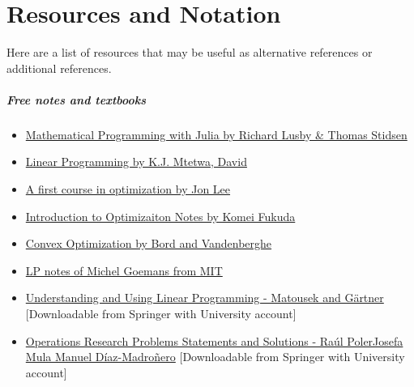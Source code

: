



\chapter{Resources and Notation}
Here are a list of resources that may be useful as alternative references or additional references.

\paragraph{\textbf{Free notes and textbooks}}
\begin{itemize}
\item \href{https://ifors.org/developing_countries/index.php/Mathematical_Programming_with_Julia}{Mathematical Programming with Julia by Richard Lusby \& Thomas Stidsen}
\item \href{https://oer.avu.org/handle/123456789/780}{Linear Programming by K.J. Mtetwa, David}
\item \href{http://www.optimization-online.org/DB_FILE/2013/12/4161.pdf}{A first course in optimization by Jon Lee}
\item \href{https://people.inf.ethz.ch/fukudak/lect/opt2011/aopt11note1.pdf}{Introduction to Optimizaiton Notes by Komei Fukuda}
\item \href{https://web.stanford.edu/~boyd/cvxbook/}{Convex Optimization by Bord and Vandenberghe}
\item  \href{http://math.mit.edu/~goemans/18310S15/lpnotes310.pdf}{LP notes of Michel Goemans from MIT }
\item \href{https://www.springer.com/gp/book/9783540306979}{Understanding and Using Linear Programming - Matousek and G\"artner} [Downloadable from Springer with University account]
\item \href{https://rd.springer.com/book/10.1007/978-1-4471-5577-5}{Operations Research Problems
Statements and Solutions
-
Ra\'ul PolerJosefa Mula Manuel D\'iaz-Madro\~nero} [Downloadable from Springer with University account]
\end{itemize}
